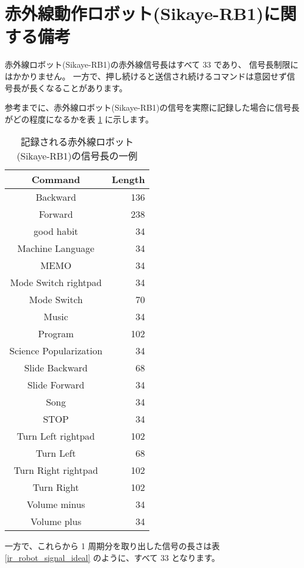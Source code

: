 \section{赤外線動作ロボット(Sikaye-RB1)に関する備考} \label{ir_robot_notice}
赤外線ロボット(Sikaye-RB1)の赤外線信号長はすべて 33 であり、
信号長制限にはかかりません。
一方で、押し続けると送信され続けるコマンドは意図せず信号長が長くなることがあります。

参考までに、赤外線ロボット(Sikaye-RB1)の信号を実際に記録した場合に信号長がどの程度になるかを表 \ref{ir_robot_signal} に示します。

\begin{table}[htbp] \begin{center}
    \caption{記録される赤外線ロボット(Sikaye-RB1)の信号長の一例}
    \label{ir_robot_signal}
    \begin{tabular}{cr}
\hline
Command & Length \\
\hline
Backward & 136 \\
Forward & 238 \\
good habit & 34 \\
Machine Language & 34 \\
MEMO & 34 \\
Mode Switch rightpad & 34 \\
Mode Switch & 70 \\
Music & 34 \\
Program & 102 \\
Science Popularization & 34 \\
Slide Backward & 68 \\
Slide Forward & 34 \\
Song & 34 \\
STOP & 34 \\
Turn Left rightpad & 102 \\
Turn Left & 68 \\
Turn Right rightpad & 102 \\
Turn Right & 102 \\
Volume minus & 34 \\
Volume plus & 34 \\
\hline
    \end{tabular}
\end{center} \end{table}

一方で、これらから 1 周期分を取り出した信号の長さは表 \ref{ir_robot_signal_ideal} のように、すべて 33 となります。

